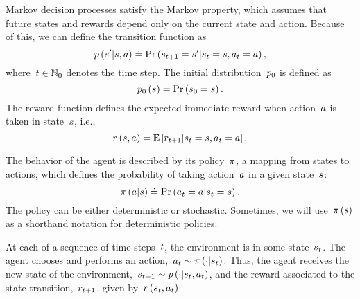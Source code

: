 Markov decision processes satisfy the Markov property, which assumes that future states and rewards depend only on the current state and action. Because of this, we can define the transition function as
\begin{equation} \label{eq:transition_probability}
    \transition\left(\state'\middle\vert\state,\action\right)\doteq\Pr\left(\randomstate_{\timestep+1}=\state'\middle\vert\randomstate_{\timestep}=\state,\randomaction_{\timestep}=\action\right),
\end{equation}
where~${t\in\mathbb{N}_{0}}$ denotes the time step. The initial distribution~${p_{0}}$ is defined as
\begin{equation}
	\initialdistribution\left(\state\right)=\Pr\left(\randomstate_{0}=\state\right).
\end{equation}
The reward function defines the expected immediate reward when action~${\action}$ is taken in state~${\state}$, i.e.,
\begin{equation} \label{eq:reward_function}
	\immediatereward\left(\state,\action\right)=\mathbb{E}\left[\randomreward_{\timestep+1}\middle\vert\randomstate_{\timestep}=\state,\randomaction_{\timestep}=\action\right].
\end{equation}

The behavior of the agent is described by its policy~${\pi}$, a mapping from states to actions, which defines the probability of taking action~${\action}$ in a given state~${\state}$:
\begin{equation} \label{eq:policy}
    \policy\left(\action\middle\vert\state\right)\doteq\Pr\left(\randomaction_{\timestep}=\action\middle\vert\randomstate_{\timestep}=\state\right).
\end{equation}
The policy can be either deterministic or stochastic. Sometimes, we will use~${\policy\left(\state\right)}$ as a shorthand notation for deterministic policies.

At each of a sequence of time steps~${t}$, the environment is in some state~${s_{t}}$. The agent chooses and performs an action,~${a_{t}\sim\pi\left(\cdot\middle\vert s_{t}\right)}$. Thus, the agent receives the new state of the environment,~${s_{t+1}\sim p\left(\cdot\middle\vert s_{t},a_{t}\right)}$, and the reward associated to the state transition,~${r_{t+1}}$, given by~${r\left(s_{t},a_{t}\right)}$.

